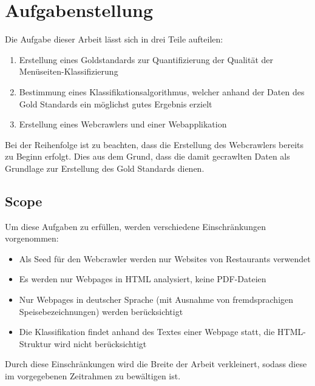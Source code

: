 \chapter{Aufgabenstellung}
Die Aufgabe dieser Arbeit lässt sich in drei Teile aufteilen:
\begin{enumerate}
	\item Erstellung eines Goldstandards zur Quantifizierung der Qualität der Menüseiten-Klassifizierung
	\item Bestimmung eines Klassifikationsalgorithmus, welcher anhand der Daten des Gold Standards ein möglichst gutes Ergebnis erzielt
	\item Erstellung eines Webcrawlers und einer Webapplikation
\end{enumerate}
Bei der Reihenfolge ist zu beachten, dass die Erstellung des Webcrawlers bereits zu Beginn erfolgt.
Dies aus dem Grund, dass die damit gecrawlten Daten als Grundlage zur Erstellung des Gold Standards dienen.
\section{Scope}
\label{chap:scope}
Um diese Aufgaben zu erfüllen, werden verschiedene Einschränkungen vorgenommen:
\begin{itemize}
	\item Als Seed für den Webcrawler werden nur Websites von Restaurants verwendet
	\item Es werden nur Webpages in HTML analysiert, keine PDF-Dateien
	\item Nur Webpages in deutscher Sprache (mit Ausnahme von fremdsprachigen Speisebezeichnungen) werden berücksichtigt
	\item Die Klassifikation findet anhand des Textes einer Webpage statt, die HTML-Struktur wird nicht berücksichtigt
\end{itemize}
Durch diese Einschränkungen wird die Breite der Arbeit verkleinert, sodass diese im vorgegebenen Zeitrahmen zu bewältigen ist.